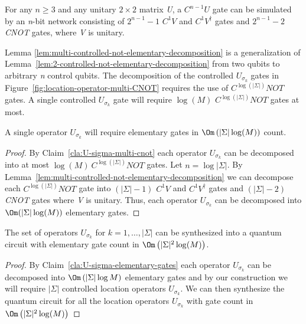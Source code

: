 \begin{lemma}\label{lem:multi-controlled-not-elementary-decomposition}
For any $n \geq 3$ and any unitary $2 \times 2$  matrix \textit{U}, a $C^{n-1}U$ gate can be simulated by an \textit{n}-bit network consisting of $2^{n-1} - 1$ $C^1 V$ and $C^1 V^\dagger$ gates and $2^{n-1} - 2$ \textit{CNOT} gates, where \textit{V} is unitary.
\end{lemma}
Lemma \ref{lem:multi-controlled-not-elementary-decomposition} is a generalization of Lemma~\ref{lem:2-controlled-not-elementary-decomposition} from two qubits to arbitrary \textit{n} control qubits. The decomposition of the controlled $U_{\sigma_{k}}$ gates in Figure~\ref{fig:location-operator-multi-CNOT} requires the use of $C^{\log(\vert\Sigma\vert)}NOT$ gates. A single controlled $U_{\sigma_{k}}$ gate will require $\log(M)$ $C^{\log(\vert\Sigma\vert)}NOT$ gates at most.
\begin{claim}\label{cla:U-sigma-elementary-gates}
A single operator $U_{\sigma_k}$ will require elementary gates in $\Om\left(\vert \Sigma \vert \log(M) \right)$ count.
\end{claim}
\begin{proof}
By Claim~\ref{cla:U-sigma-multi-cnot} each operator $U_{\sigma_k}$ can be decomposed into at most $\log(M)\ C^{\log(\vert \Sigma \vert)}NOT$ gates. Let $n=\log \vert \Sigma \vert$. By Lemma~\ref{lem:multi-controlled-not-elementary-decomposition} we can decompose each $C^{\log(\vert \Sigma \vert)}NOT$ gate into $(\vert \Sigma \vert - 1)$ $C^1 V$ and $C^1 V^\dagger$ gates and $(\vert \Sigma \vert - 2)$ \textit{CNOT} gates where \textit{V} is unitary. Thus, each operator $U_{\sigma_k}$ can be decomposed into $\Om(\vert \Sigma \vert \log(M))$ elementary gates.
\end{proof}

\begin{lemma}\label{lem:U-sigma-circuit-complexity}
The set of operators $U_{\sigma_k}$ for $k=1,\ldots,\vert \Sigma \vert$ can be synthesized into a quantum circuit with elementary gate count in $\Om\left(\vert \Sigma \vert^2\log(M)\right)$.
\end{lemma}
\begin{proof}
By Claim~\ref{cla:U-sigma-elementary-gates} each operator $U_{\sigma_k}$ can be decomposed into $\Om\left(\vert \Sigma \vert \log M \right)$ elementary gates and by our construction we will require $\vert \Sigma \vert$ controlled location operators $U_{\sigma_k}$. We can then synthesize the quantum circuit for all the location operators $U_{\sigma_k}$ with gate count in $\Om\left(\vert \Sigma \vert^2\log(M)\right)$
\end{proof}

